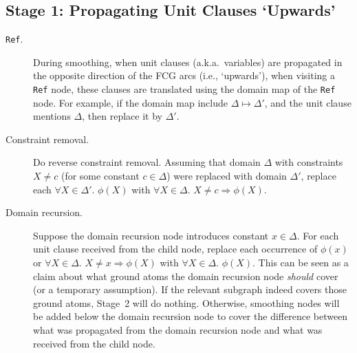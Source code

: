 \documentclass{article}
\begin{document}

\subsection{Stage 1: Propagating Unit Clauses `Upwards'}

\begin{description}
  \item[\texttt{Ref}.] During smoothing, when unit clauses (a.k.a.\ variables)
        are propagated in the opposite direction of the FCG arcs (i.e.,
        `upwards'), when visiting a \texttt{Ref} node, these clauses are
        translated using the domain map of the \texttt{Ref} node. For example,
        if the domain map include $\Delta \mapsto \Delta'$, and the unit clause
        mentions $\Delta$, then replace it by $\Delta'$.
  \item[Constraint removal.] Do reverse constraint removal. Assuming that
        domain $\Delta$ with constraints $X \ne c$ (for some constant
        $c \in \Delta$) were replaced with domain $\Delta'$, replace each
        $\forall X \in \Delta'\text{. }\phi(X)$ with
        $\forall X \in \Delta\text{. }X \ne c \Rightarrow \phi(X)$.
  \item[Domain recursion.] Suppose the domain recursion node introduces constant
        $x \in \Delta$. For each unit clause received from the child node,
        replace each occurrence of $\phi(x)$ or $\forall X \in \Delta\text{.
        } X \ne x \Rightarrow \phi(X)$ with $\forall X \in \Delta\text{.
        }\phi(X)$. This can be seen as a claim about what ground atoms the
        domain recursion node \emph{should} cover (or a temporary assumption).
        If the relevant subgraph indeed covers those ground atoms, Stage~2 will
        do nothing. Otherwise, smoothing nodes will be added below the domain
        recursion node to cover the difference between what was propagated from
        the domain recursion node and what was received from the child node.
\end{description}
\end{document}
